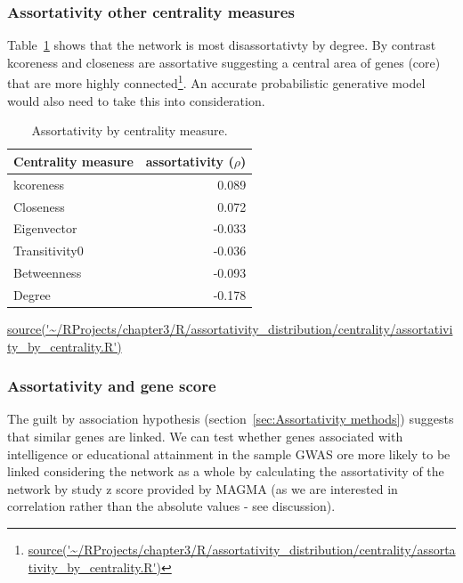 %
%
%
\subsubsection{Assortativity other centrality measures}


Table~\ref{tab:assortativity by centrality} shows that the network is most disassortativty by degree. By contrast kcoreness and closeness are assortative suggesting a central area of genes (core) that are more highly connected\footnote{\url{source('~/RProjects/chapter3/R/assortativity_distribution/centrality/assortativity_by_centrality.R')}}. An accurate probabilistic generative model would also need to take this into consideration.  

\begin{table}[ht]
\centering
\begin{tabular}{lr}
  \toprule
Centrality measure & assortativity ($\rho$) \\ 
  \midrule
kcoreness & 0.089 \\ 
  Closeness & 0.072 \\ 
  Eigenvector & -0.033 \\ 
  Transitivity0 & -0.036 \\ 
  Betweenness & -0.093 \\ 
  Degree & -0.178 \\ 
   \bottomrule
\end{tabular}
\caption{Assortativity by centrality measure.}
\tiny\url{source('~/RProjects/chapter3/R/assortativity_distribution/centrality/assortativity_by_centrality.R')} 
\label{tab:assortativity by centrality}
\end{table}


\subsubsection{Assortativity and gene score}

 The guilt by association hypothesis (section~\ref{sec:Assortativity methods}) suggests that similar genes are linked. We can test whether genes associated with intelligence or educational attainment in the sample GWAS ore more likely to be linked considering the network as a whole by calculating the assortativity of the network by study z score provided by MAGMA (as we are interested in correlation rather than the absolute values - see discussion). 
 
